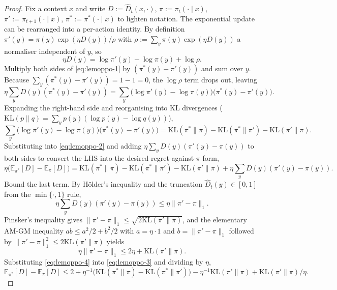 \documentclass[11pt]{article}
\newcommand{\E}{\mathbb{E}}
\begin{document}
\begin{proof}
Fix a context $x$ and write $D := \hat D_t(x, \cdot)$, $\pi := \pi_t(\cdot \mid x)$, $\pi' := \pi_{t+1}(\cdot \mid x)$, $\pi^* := \pi^*(\cdot \mid x)$ to lighten notation. The exponential update can be rearranged into a per-action identity. By definition $\pi'(y) = \pi(y) \exp(\eta D(y)) / \rho$ with $\rho := \sum_y \pi(y) \exp(\eta D(y))$ a normaliser independent of $y$, so
\begin{equation}
  \eta D(y) = \log \pi'(y) - \log \pi(y) + \log \rho.
  \label{eq:lemoppo-1}
\end{equation}
Multiply both sides of \eqref{eq:lemoppo-1} by $(\pi^*(y) - \pi'(y))$ and sum over $y$. Because $\sum_y (\pi^*(y) - \pi'(y)) = 1 - 1 = 0$, the $\log\rho$ term drops out, leaving
\begin{equation}
  \eta \sum_y D(y)(\pi^*(y) - \pi'(y))
  = \sum_y \bigl(\log \pi'(y) - \log \pi(y)\bigr)\bigl(\pi^*(y) - \pi'(y)\bigr).
  \label{eq:lemoppo-2}
\end{equation}
Expanding the right-hand side and reorganising into KL divergences ($\mathrm{KL}(p \| q) = \sum_y p(y)(\log p(y) - \log q(y))$),
\[
  \sum_y \bigl(\log \pi'(y) - \log \pi(y)\bigr)\bigl(\pi^*(y) - \pi'(y)\bigr)
  = \mathrm{KL}(\pi^* \| \pi) - \mathrm{KL}(\pi^* \| \pi') - \mathrm{KL}(\pi' \| \pi).
\]
Substituting into \eqref{eq:lemoppo-2} and adding $\eta \sum_y D(y)(\pi'(y) - \pi(y))$ to both sides to convert the LHS into the desired regret-against-$\pi$ form,
\begin{equation}
  \eta\bigl(\E_{\pi^*}[D] - \E_\pi[D]\bigr)
  = \mathrm{KL}(\pi^* \| \pi) - \mathrm{KL}(\pi^* \| \pi') - \mathrm{KL}(\pi' \| \pi) + \eta \sum_y D(y)(\pi'(y) - \pi(y)).
  \label{eq:lemoppo-3}
\end{equation}
Bound the last term. By H\"older's inequality and the truncation $\hat D_t(y) \in [0, 1]$ from the $\min\{\cdot, 1\}$ rule,
\[
  \eta \sum_y D(y)(\pi'(y) - \pi(y))
  \le \eta \|\pi' - \pi\|_1.
\]
Pinsker's inequality gives $\|\pi' - \pi\|_1 \le \sqrt{2 \mathrm{KL}(\pi' \| \pi)}$, and the elementary AM-GM inequality $a b \le a^2/2 + b^2/2$ with $a = \eta \cdot 1$ and $b = \|\pi' - \pi\|_1$ followed by $\|\pi'-\pi\|_1^2 \le 2 \mathrm{KL}(\pi' \| \pi)$ yields
\begin{equation}
  \eta \|\pi' - \pi\|_1 \le 2\eta + \mathrm{KL}(\pi' \| \pi).
  \label{eq:lemoppo-4}
\end{equation}
Substituting \eqref{eq:lemoppo-4} into \eqref{eq:lemoppo-3} and dividing by $\eta$,
\[
  \E_{\pi^*}[D] - \E_\pi[D]
  \le 2 + \eta^{-1}\bigl(\mathrm{KL}(\pi^* \| \pi) - \mathrm{KL}(\pi^* \| \pi')\bigr) - \eta^{-1} \mathrm{KL}(\pi' \| \pi) + \mathrm{KL}(\pi' \| \pi)/\eta.
\]
\end{proof}
\end{document}
